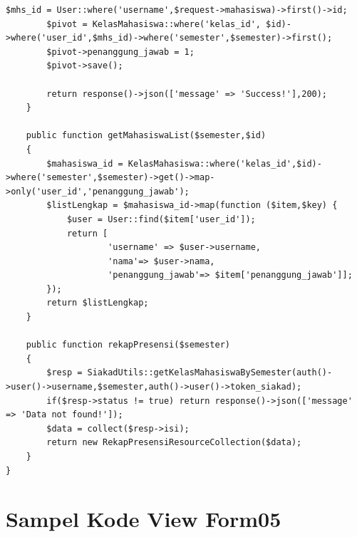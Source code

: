 \begin{lstlisting}[breaklines]
        $mhs_id = User::where('username',$request->mahasiswa)->first()->id;
        $pivot = KelasMahasiswa::where('kelas_id', $id)->where('user_id',$mhs_id)->where('semester',$semester)->first();
        $pivot->penanggung_jawab = 1;
        $pivot->save();

        return response()->json(['message' => 'Success!'],200);
    }

    public function getMahasiswaList($semester,$id)
    {
        $mahasiswa_id = KelasMahasiswa::where('kelas_id',$id)->where('semester',$semester)->get()->map->only('user_id','penanggung_jawab');
        $listLengkap = $mahasiswa_id->map(function ($item,$key) {
            $user = User::find($item['user_id']);
            return [
                    'username' => $user->username,
                    'nama'=> $user->nama,
                    'penanggung_jawab'=> $item['penanggung_jawab']];
        });
        return $listLengkap;
    }

    public function rekapPresensi($semester)
    {
        $resp = SiakadUtils::getKelasMahasiswaBySemester(auth()->user()->username,$semester,auth()->user()->token_siakad);
        if($resp->status != true) return response()->json(['message' => 'Data not found!']);
        $data = collect($resp->isi);
        return new RekapPresensiResourceCollection($data);
    }
}
\end{lstlisting}

\chapter{Sampel Kode View Form05}

